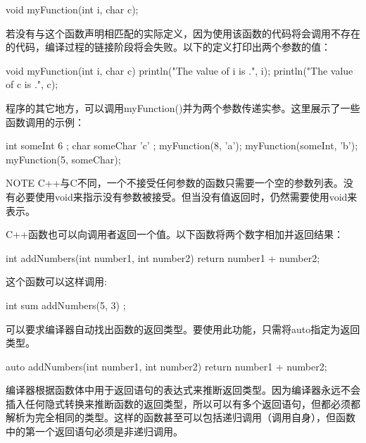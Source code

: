 \begin{cpp}
void myFunction(int i, char c);
\end{cpp}

若没有与这个函数声明相匹配的实际定义，因为使用该函数的代码将会调用不存在的代码，编译过程的链接阶段将会失败。以下的定义打印出两个参数的值：

\begin{cpp}
void myFunction(int i, char c)
{
    println("The value of i is {}.", i);
    println("The value of c is {}.", c);
}
\end{cpp}

程序的其它地方，可以调用myFunction()并为两个参数传递实参。这里展示了一些函数调用的示例：

\begin{cpp}
int someInt { 6 };
char someChar { 'c' };
myFunction(8, 'a');
myFunction(someInt, 'b');
myFunction(5, someChar);
\end{cpp}

\begin{myNotic}{NOTE}
C++与C不同，一个不接受任何参数的函数只需要一个空的参数列表。没有必要使用void来指示没有参数被接受。但当没有值返回时，仍然需要使用void来表示。

\end{myNotic}

C++函数也可以向调用者返回一个值。以下函数将两个数字相加并返回结果：

\begin{cpp}
int addNumbers(int number1, int number2)
{
    return number1 + number2;
}
\end{cpp}

这个函数可以这样调用:

\begin{cpp}
int sum { addNumbers(5, 3) };
\end{cpp}


可以要求编译器自动找出函数的返回类型。要使用此功能，只需将auto指定为返回类型。

\begin{cpp}
auto addNumbers(int number1, int number2)
{
    return number1 + number2;
}
\end{cpp}

编译器根据函数体中用于返回语句的表达式来推断返回类型。因为编译器永远不会插入任何隐式转换来推断函数的返回类型，所以可以有多个返回语句，但都必须都解析为完全相同的类型。这样的函数甚至可以包括递归调用（调用自身），但函数中的第一个返回语句必须是非递归调用。


